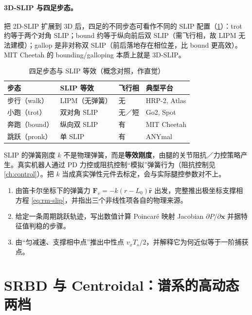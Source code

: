 \paragraph{3D-SLIP 与四足步态。}
把 2D-SLIP 扩展到 3D 后，四足的不同步态可看作不同的 SLIP 配置（\cref{tab:rm-slip-gait}）：trot 约等于两个对角 SLIP；bound 约等于纵向前后双 SLIP（需飞行相，故 LIPM 无法建模）；gallop 是非对称双 SLIP（前后落地存在相位差，比 bound 更高效）。MIT Cheetah 的 bounding/galloping 本质上就是 3D-SLIP。

\begin{table}[H]\centering\small
\caption{四足步态与 SLIP 等效（概念对照，作直觉）}
\label{tab:rm-slip-gait}
\begin{tabular}{llll}
\toprule
步态 & SLIP 等效 & 飞行相 & 典型平台 \\
\midrule
步行（walk） & LIPM（无弹簧） & 无 & HRP-2, Atlas \\
小跑（trot） & 双对角 SLIP & 无／短 & Go2, Spot \\
奔跑（bound） & 纵向双 SLIP & 有 & MIT Cheetah \\
跳跃（pronk） & 单 SLIP & 有 & ANYmal \\
\bottomrule
\end{tabular}
\end{table}

\begin{pitfall}
SLIP 的弹簧刚度 $k$ 不是物理弹簧，而是\textbf{等效刚度}，由腿的关节阻抗／力控策略产生。真实机器人通过 PD 力控或阻抗控制“模拟”弹簧行为（阻抗控制见 \cref{ch:control}）。把 $k$ 当成真实弹性元件去标定，会与实际腿控参数对不上。
\end{pitfall}

\begin{exercise}
\begin{enumerate}
  \item 由笛卡尔坐标下的弹簧力 $\mathbf{F}_s=-k(r-L_0)\hat{\mathbf{r}}$ 出发，完整推出极坐标支撑相方程 \cref{eq:rm-slip}，并指出三个非线性项各自的物理来源。
  \item 给定一条周期跳跃轨迹，写出数值计算 Poincaré 映射 Jacobian $\partial P/\partial\mathbf{x}$ 并据特征值判稳的步骤。
  \item 由“匀减速、支撑相中点”推出中性点 $v_x T_s/2$，并解释它为何近似等于一阶捕获点。
\end{enumerate}
\end{exercise}

\section{SRBD 与 Centroidal：谱系的高动态两档}
\label{sec:rm-srbd-centroidal}

